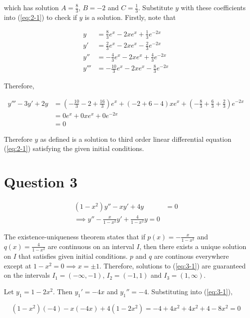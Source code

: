 \documentclass{article}
\begin{document}
which has solution $A = \frac{8}{3}$, $B = -2$ and $C = \frac{1}{3}$. Substitute $y$ with these coefficients into (\ref{eq:2-1}) to check if $y$ is a solution. Firstly, note that

\begin{align*}
    y &= \frac{8}{3}e^x - 2xe^x + \frac{1}{3}e^{-2x}\\
    y' &= \frac{2}{3}e^x - 2xe^x - \frac{2}{3}e^{-2x}\\
    y'' &= -\frac{4}{3}e^x - 2xe^x + \frac{4}{3}e^{-2x}\\
    y''' &= -\frac{10}{3}e^x - 2xe^x - \frac{8}{3}e^{-2x}
\end{align*}

Therefore,

\begin{align*}
    y''' - 3y' + 2y &= \left(-\frac{10}{3} - 2 + \frac{16}{3}\right)e^x + (-2 + 6 - 4)xe^x + \left(-\frac{8}{3} + \frac{6}{3} + \frac{2}{3}\right)e^{-2x}\\
    &= 0e^x + 0xe^x + 0e^{-2x}\\
    &= 0
\end{align*}

Therefore $y$ as defined is a solution to third order linear differential equation (\ref{eq:2-1}) satisfying the given initial conditions.

\section*{Question 3}

\begin{align}
    (1 - x^2)y'' - xy' + 4y &= 0 \label{eq:3-1}\\
    \implies y'' - \frac{x}{1 - x^2}y' + \frac{4}{1 - x^2}y = 0 \label{eq:3-2}
\end{align}

The existence-uniqueness theorem states that if $p(x) = -\frac{x}{1 - x^2}$ and $q(x) = \frac{4}{1 - x^2}$ are continuous on an interval $I$,
then there exists a unique solution on $I$ that satisfies given initial conditions. $p$ and $q$ are continous everywhere except at
$1 - x^2 = 0 \implies x = \pm 1$. Therefore, solutions to (\ref{eq:3-1}) are guaranteed on the intervals $I_1 = (-\infty, -1)$, $I_2 = (-1, 1)$ and
$I_3 = (1, \infty)$.

\hfill \break
Let $y_1 = 1 - 2x^2$. Then $y_1' = -4x$ and $y_1'' = -4$. Substituting into (\ref{eq:3-1}),

\begin{equation*}
    (1 - x^2)(-4) - x(-4x) + 4(1 - 2x^2) = -4 + 4x^2 + 4x^2 + 4 - 8x^2 = 0
\end{equation*}
\end{document}

